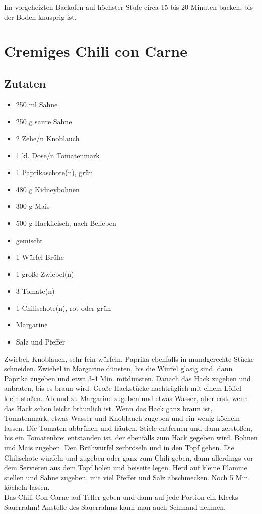 \documentclass{article}
\begin{document}
	Im vorgeheizten Backofen auf höchster Stufe circa 15 bis 20 Minuten backen,
	bis der Boden knusprig ist.

\section{Cremiges Chili con Carne}
	\subsection*{Zutaten}
	\begin{itemize}
		\item 250 ml Sahne
		\item 250 g saure Sahne
		\item 2 Zehe/n Knoblauch
		\item 1 kl. Dose/n Tomatenmark
		\item 1 Paprikaschote(n), grün
		\item 480 g Kidneybohnen
		\item 300 g Mais
		\item 500 g Hackfleisch, nach Belieben
		\item gemischt
		\item 1 Würfel Brühe
		\item 1 große Zwiebel(n)
		\item 3 Tomate(n)
		\item 1 Chilischote(n), rot oder grün
		\item Margarine
		\item Salz und Pfeffer
	\end{itemize}
	Zwiebel, Knoblauch, sehr fein würfeln. Paprika
	ebenfalls in mundgerechte Stücke schneiden.
	Zwiebel in Margarine dünsten, bis die Würfel glasig
	sind, dann Paprika zugeben und etwa 3-4 Min.
	mitdünsten. Danach das Hack zugeben und anbraten,
	bis es braun wird. Große Hackstücke nachträglich mit
	einem Löffel klein stoßen. Ab und zu Margarine
	zugeben und etwas Wasser, aber erst, wenn das
	Hack schon leicht bräunlich ist. Wenn das Hack ganz
	braun ist, Tomatenmark, etwas Wasser und
	Knoblauch zugeben und ein wenig köcheln lassen.
	Die Tomaten abbrühen und häuten, Stiele entfernen
	und dann zerstoßen, bis ein Tomatenbrei entstanden
	ist, der ebenfalls zum Hack gegeben wird. Bohnen
	und Mais zugeben. Den Brühwürfel zerbröseln und in
	den Topf geben. Die Chilischote würfeln und zugeben
	oder ganz zum Chili geben, dann allerdings vor dem
	Servieren aus dem Topf holen und beiseite legen.
	Herd auf kleine Flamme stellen und Sahne zugeben,
	mit viel Pfeffer und Salz abschmecken. Noch 5 Min.
	köcheln lassen. \\
	Das Chili Con Carne auf Teller geben und dann auf
	jede Portion ein Klecks Sauerrahm!
	Anstelle des Sauerrahms kann man auch Schmand
	nehmen.
\end{document}
